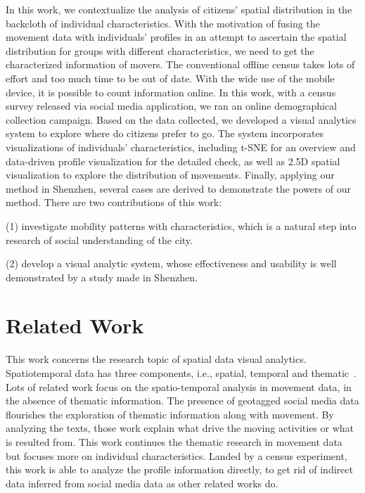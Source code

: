 \documentclass{ieeeaccess}
\begin{document}
In this work, we contextualize the analysis of citizens' spatial distribution in the backcloth of individual characteristics. With the motivation of fusing the movement data with individuals' profiles in an attempt to ascertain the spatial distribution for groups with different characteristics, we need to get the characterized information of movers. The conventional offline census takes lots of effort and too much time to be out of date. With the wide use of the mobile device, it is possible to count information online. In this work, with a census survey released via social media application, we ran an online demographical collection campaign. Based on the data collected, we developed a visual analytics system to explore where do citizens prefer to go. The system incorporates visualizations of individuals' characteristics, including t-SNE for an overview and data-driven profile visualization for the detailed check, as well as 2.5D spatial visualization to explore the distribution of movements. Finally, applying our method in Shenzhen, several cases are derived to demonstrate the powers of our method. There are two contributions of this work:

(1) investigate mobility patterns with characteristics, which is a natural step into research of social understanding of the city.

(2) develop a visual analytic system, whose effectiveness and usability is well demonstrated by a study made in Shenzhen.




\section{Related Work}
This work concerns the research topic of spatial data visual analytics. Spatiotemporal data has three components, i.e., spatial, temporal and thematic~\cite{andrienko2013visual}. Lots of related work focus on the spatio-temporal analysis in movement data, in the absence of thematic information. The presence of geotagged social media data flourishes the exploration of thematic information along with movement. By analyzing the texts, those work explain what drive the moving activities or what is resulted from. This work continues the thematic research in movement data but focuses more on individual characteristics. Landed by a census experiment, this work is able to analyze the profile information directly, to get rid of indirect data inferred from social media data as other related works do.
\end{document}
